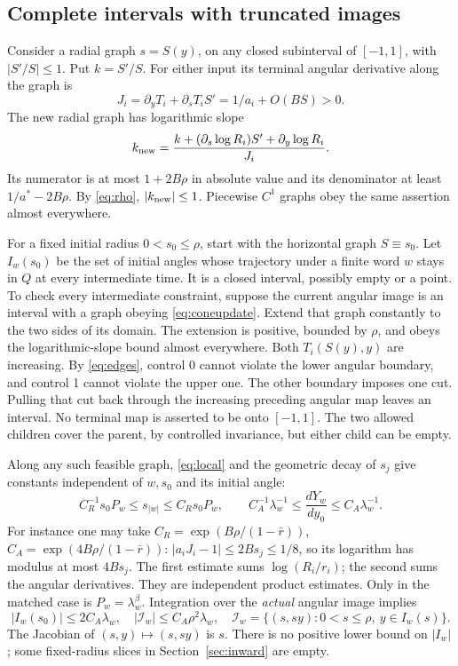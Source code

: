 \documentclass[11pt]{amsart}
\theoremstyle{definition}
\theoremstyle{remark}
\numberwithin{equation}{section}
\begin{document}
\subsection{Complete intervals with truncated images}
Consider a radial graph \(s=S(y)\), on any closed subinterval of
\([-1,1]\), with \(|S'/S|\le1\). Put \(k=S'/S\).
For either input its terminal angular derivative along the graph is
\[
 J_i=\partial_yT_i+\partial_sT_i S'
           =1/a_i+O(BS)>0.
\]
The new radial graph has logarithmic slope
\begin{equation}
k_{\rm new}
 =\frac{k+(\partial_s\log R_i)S'+\partial_y\log R_i}{J_i}.
                                                                  \label{eq:coneupdate}
\end{equation}
Its numerator is at most \(1+2B\rho\) in absolute value and its
denominator at least \(1/a^*-2B\rho\). By \eqref{eq:rho}, \(|k_{\rm new}|\le1\).
Piecewise \(C^1\) graphs obey the same assertion almost everywhere.

For a fixed initial radius \(0<s_0\le\rho\), start with the horizontal
graph \(S\equiv s_0\). Let \(I_w(s_0)\) be the set of initial angles
whose trajectory under a finite word \(w\) stays in $Q$ at every
intermediate time. It is a closed interval, possibly empty or a point.
To check every intermediate constraint, suppose the current angular
image is an interval with a graph obeying \eqref{eq:coneupdate}. Extend that graph
constantly to the two sides of its domain. The extension is positive,
bounded by \(\rho\), and obeys the logarithmic-slope bound almost
everywhere. Both \(T_i(S(y),y)\) are increasing. By \eqref{eq:edges}, control 0
cannot violate the lower angular boundary, and control 1 cannot
violate the upper one. The other boundary imposes one cut. Pulling
that cut back through the increasing preceding angular map leaves
an interval. No terminal map is asserted to be onto \([-1,1]\).
The two allowed children cover the parent, by controlled invariance,
but either child can be empty.

Along any such feasible graph, \eqref{eq:local} and the geometric decay of \(s_j\)
give constants independent of \(w,s_0\) and its initial angle:
\begin{equation}
C_R^{-1}s_0P_w\le s_{|w|}
                  \le C_Rs_0P_w,\qquad
 C_A^{-1}\lambda_w^{-1}\le \frac{dY_w}{dy_0}
                  \le C_A\lambda_w^{-1}.                    \label{eq:products}
\end{equation}
For instance one may take
\(C_R=\exp(B\rho/(1-\bar r))\),
\(C_A=\exp(4B\rho/(1-\bar r))\):
\(|a_iJ_i-1|\le2Bs_j\le1/8\), so its logarithm has modulus at
most \(4Bs_j\). The first estimate sums \(\log(R_i/r_i)\);
the second sums the angular derivatives. They are independent product
estimates. Only in the matched case is \(P_w=\lambda_w^\beta\).
Integration over the \emph{actual} angular image implies
\begin{equation}
|I_w(s_0)|\le2C_A\lambda_w,
 \quad |\mathcal I_w|\le C_A\rho^2\lambda_w,
 \quad \mathcal I_w=\{(s,sy):0<s\le\rho,\ y\in I_w(s)\}.      \label{eq:striparea}
\end{equation}
The Jacobian of \((s,y)\mapsto(s,sy)\) is \(s\).
There is no positive lower bound on \(|I_w|\); some fixed-radius slices in Section~\ref{sec:inward} are empty.
\end{document}
